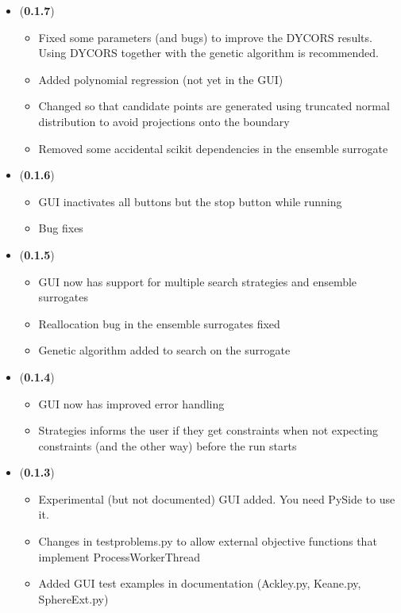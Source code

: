 \documentclass[]{article}
\begin{document}
\begin{itemize}
	\item (\textbf{0.1.7}) 
	\begin{itemize}
		\item Fixed some parameters (and bugs) to improve the DYCORS results. Using DYCORS together 
		with the genetic algorithm is recommended.
		\item Added polynomial regression (not yet in the GUI)
		\item Changed so that candidate points are generated using truncated normal distribution to avoid 
		projections onto the boundary
		\item Removed some accidental scikit dependencies in the ensemble surrogate
	\end{itemize}

	\item (\textbf{0.1.6}) 
	\begin{itemize}
		\item GUI inactivates all buttons but the stop button while running
		\item Bug fixes
	\end{itemize}

	\item (\textbf{0.1.5}) 
	\begin{itemize}
		\item GUI now has support for multiple search strategies and ensemble surrogates
		\item Reallocation bug in the ensemble surrogates fixed
		\item Genetic algorithm added to search on the surrogate
	\end{itemize}

	\item (\textbf{0.1.4}) 
	\begin{itemize}
		\item GUI now has improved error handling 
		\item Strategies informs the user if they get constraints when not expecting constraints 
		(and the other way) before the run starts
	\end{itemize}

	\item (\textbf{0.1.3}) 
	\begin{itemize}
		\item Experimental (but not documented) GUI added. You need PySide to use it.
		\item Changes in testproblems.py to allow external objective functions that implement 
		ProcessWorkerThread
		\item Added GUI test examples in documentation (Ackley.py, Keane.py, SphereExt.py)
	\end{itemize}


\end{itemize}
\end{document}
